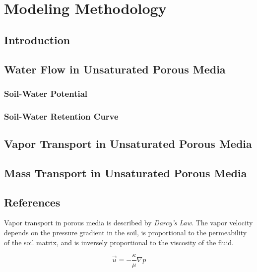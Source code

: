\documentclass[../thesis.tex]{subfiles}
\begin{document}
\chapter{Modeling Methodology}

\section{Introduction}

\section{Water Flow in Unsaturated Porous Media}

\subsection{Soil-Water Potential}

\subsection{Soil-Water Retention Curve}

\section{Vapor Transport in Unsaturated Porous Media}

\section{Mass Transport in Unsaturated Porous Media}


\section{References}


Vapor transport in porous media is described by \textit{Darcy's Law}.
The vapor velocity depends on the pressure gradient in the soil, is proportional to the permeability of the soil matrix, and is inversely proportional to the viscosity of the fluid.

\begin{equation}\label{eq:darcys_law_saturated}
  \vec{u} = -\frac{\kappa}{\mu}\nabla p
\end{equation}
\end{document}
